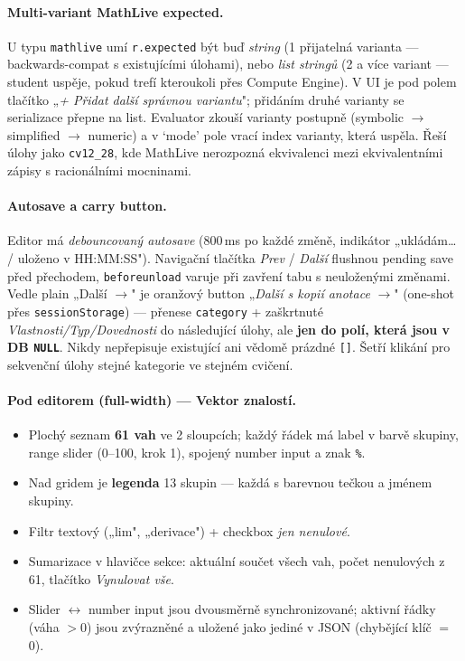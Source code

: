 \documentclass[11pt,a4paper]{article}
\begin{document}
\paragraph{Multi-variant MathLive expected.} U typu \texttt{mathlive} umí \texttt{r.expected} být buď \emph{string} (1 přijatelná varianta --- backwards-compat s existujícími úlohami), nebo \emph{list stringů} (2 a více variant --- student uspěje, pokud trefí kteroukoli přes Compute Engine). V UI je pod polem tlačítko „\emph{+ Přidat další správnou variantu}"; přidáním druhé varianty se serializace přepne na list. Evaluator zkouší varianty postupně (symbolic $\rightarrow$ simplified $\rightarrow$ numeric) a v `mode' pole vrací index varianty, která uspěla. Řeší úlohy jako \texttt{cv12\_28}, kde MathLive nerozpozná ekvivalenci mezi ekvivalentními zápisy s racionálními mocninami.

\paragraph{Autosave a carry button.} Editor má \emph{debouncovaný autosave} (800\,ms po každé změně, indikátor „ukládám… / uloženo v HH:MM:SS"). Navigační tlačítka \emph{Prev} / \emph{Další} flushnou pending save před přechodem, \texttt{beforeunload} varuje při zavření tabu s neuloženými změnami. Vedle plain „Další $\rightarrow$" je oranžový button „\emph{Další s kopií anotace} $\rightarrow$" (one-shot přes \texttt{sessionStorage}) --- přenese \texttt{category} + zaškrtnuté \emph{Vlastnosti/Typ/Dovednosti} do následující úlohy, ale \textbf{jen do polí, která jsou v DB \texttt{NULL}}. Nikdy nepřepisuje existující ani vědomě prázdné \texttt{[]}. Šetří klikání pro sekvenční úlohy stejné kategorie ve stejném cvičení.

\paragraph{Pod editorem (full-width) --- Vektor znalostí.}
\begin{itemize}
  \item Plochý seznam \textbf{61 vah} ve 2 sloupcích; každý řádek má label v barvě skupiny, range slider (0--100, krok 1), spojený number input a znak \texttt{\%}.
  \item Nad gridem je \textbf{legenda} 13 skupin --- každá s barevnou tečkou a jménem skupiny.
  \item Filtr textový („lim", „derivace") + checkbox \emph{jen nenulové}.
  \item Sumarizace v hlavičce sekce: aktuální součet všech vah, počet nenulových z 61, tlačítko \emph{Vynulovat vše}.
  \item Slider $\leftrightarrow$ number input jsou dvousměrně synchronizované; aktivní řádky (váha $>0$) jsou zvýrazněné a uložené jako jediné v JSON (chybějící klíč $=$ 0).
\end{itemize}
\end{document}
